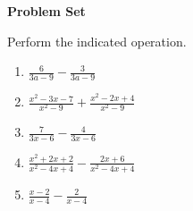 \textbf{Problem Set}

\vspce

Perform the indicated  operation. 
\vspce

\begin{enumerate}[label = \arabic*. ]

\item \hspce $\displaystyle \frac{6}{3a-9} - \frac{3}{3a-9}$
\vspce
\item \hspce $\displaystyle \frac{x^{2}-3x-7}{x^{2}-9}+\frac{x^{2}-2x+4}{x^{2}-9}$
\vspce
\item \hspce $\displaystyle \frac{7}{3x-6}-\frac{4}{3x-6}$
\vspce
\item \hspce $\displaystyle \frac{x^{2}+2x+2}{x^{2}-4x+4} - \frac{2x+6}{x^{2}-4x+4}$
\vspce
\item \hspce $\displaystyle \frac{x-2}{x-4} - \frac{2}{x-4}$

\end{enumerate}